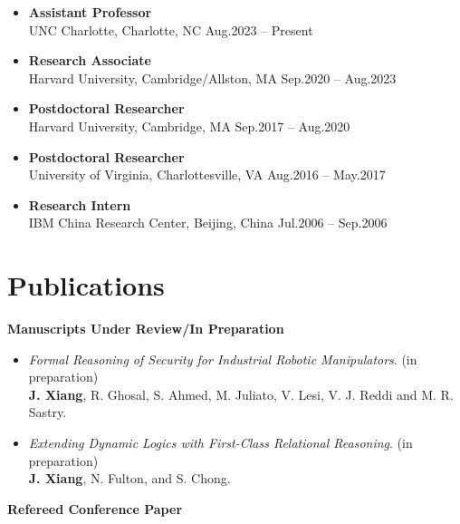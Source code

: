 \documentclass[11pt]{article}
\begin{document}
\begin{itemize}
  \item \textbf{Assistant Professor} \\
UNC Charlotte, Charlotte, NC \hfill Aug.2023 – Present
    \item \textbf{Research Associate} \\
Harvard University, Cambridge/Allston, MA \hfill Sep.2020 – Aug.2023
    \item \textbf{Postdoctoral Researcher} \\
Harvard University, Cambridge, MA \hfill Sep.2017 – Aug.2020
    \item \textbf{Postdoctoral Researcher}	\\
University of Virginia, Charlottesville, VA \hfill  Aug.2016 – May.2017
    \item \textbf{Research Intern} \\
IBM China Research Center, Beijing, China \hfill  Jul.2006 – Sep.2006
\end{itemize}





\section{Publications}


\textbf{Manuscripts Under Review/In Preparation}

\begin{itemize}
\item \textit{Formal Reasoning of Security for Industrial Robotic
Manipulators}. (in preparation) \\
\textbf{J. Xiang}, R. Ghosal, S. Ahmed, M. Juliato, V. Lesi, V. J. Reddi and M. R. Sastry. 
%
\item \textit{Extending Dynamic Logics with First-Class Relational Reasoning}. (in preparation) \\
\textbf{J. Xiang}, N. Fulton, and S. Chong. 
\end{itemize}

\textbf{Refereed Conference Paper}
\end{document}
